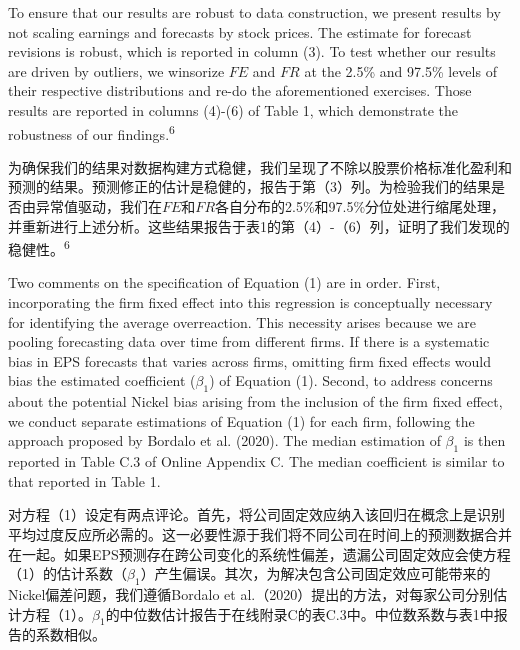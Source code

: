 \documentclass[12pt,a4paper]{article}
\newenvironment{original}
  {\par\medskip\noindent\ignorespaces}
  {\par\medskip}
\newenvironment{translation}
  {\par\noindent{\color{transblue}\ignorespaces}}
  {\par\bigskip}
\begin{document}
\begin{original}
To ensure that our results are robust to data construction, we present results by not scaling earnings and forecasts by stock prices. The estimate for forecast revisions is robust, which is reported in column (3). To test whether our results are driven by outliers, we winsorize $FE$ and $FR$ at the 2.5\% and 97.5\% levels of their respective distributions and re-do the aforementioned exercises. Those results are reported in columns (4)-(6) of Table 1, which demonstrate the robustness of our findings.\textsuperscript{6}
\end{original}
\begin{translation}
为确保我们的结果对数据构建方式稳健，我们呈现了不除以股票价格标准化盈利和预测的结果。预测修正的估计是稳健的，报告于第（3）列。为检验我们的结果是否由异常值驱动，我们在$FE$和$FR$各自分布的2.5\%和97.5\%分位处进行缩尾处理，并重新进行上述分析。这些结果报告于表1的第（4）-（6）列，证明了我们发现的稳健性。\textsuperscript{6}
\end{translation}

\begin{original}
Two comments on the specification of Equation (1) are in order. First, incorporating the firm fixed effect into this regression is conceptually necessary for identifying the average overreaction. This necessity arises because we are pooling forecasting data over time from different firms. If there is a systematic bias in EPS forecasts that varies across firms, omitting firm fixed effects would bias the estimated coefficient ($\beta_1$) of Equation (1). Second, to address concerns about the potential Nickel bias arising from the inclusion of the firm fixed effect, we conduct separate estimations of Equation (1) for each firm, following the approach proposed by Bordalo et al. (2020). The median estimation of $\beta_1$ is then reported in Table C.3 of Online Appendix C. The median coefficient is similar to that reported in Table 1.
\end{original}
\begin{translation}
对方程（1）设定有两点评论。首先，将公司固定效应纳入该回归在概念上是识别平均过度反应所必需的。这一必要性源于我们将不同公司在时间上的预测数据合并在一起。如果EPS预测存在跨公司变化的系统性偏差，遗漏公司固定效应会使方程（1）的估计系数（$\beta_1$）产生偏误。其次，为解决包含公司固定效应可能带来的Nickel偏差问题，我们遵循Bordalo et al.（2020）提出的方法，对每家公司分别估计方程（1）。$\beta_1$的中位数估计报告于在线附录C的表C.3中。中位数系数与表1中报告的系数相似。
\end{translation}
\end{document}
